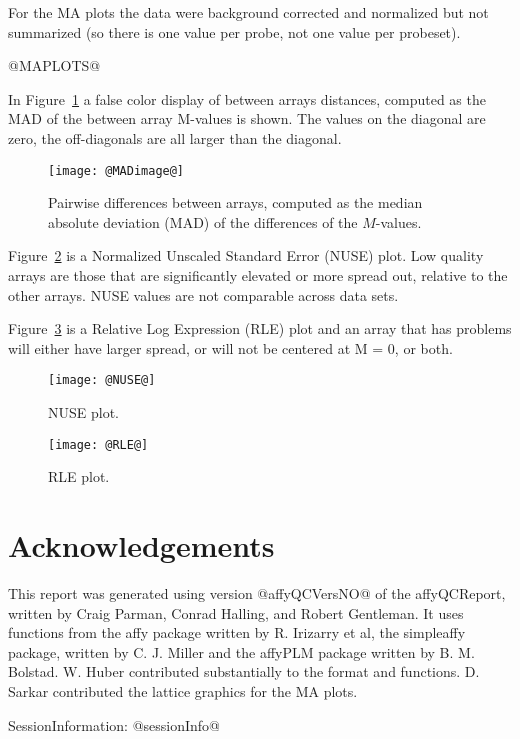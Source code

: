\documentclass[11pt]{article}
\newcommand{\Rpackage}[1]{{\textsf{#1}}}
\begin{document}
For the MA plots the data were background corrected and normalized 
but not summarized (so there is one value per probe, not one value
per probeset). 

@MAPLOTS@

In Figure~\ref{fig:MADimage} a false color display of between arrays
distances, computed as the MAD of the between array M-values is shown.
The values on the diagonal are zero, the off-diagonals are all larger
than the diagonal.

\begin{figure}[tp]
  \centering
\texttt{[image: @MADimage@]}
\caption{\label{fig:MADimage}%
Pairwise differences between arrays, computed as the median absolute 
deviation (MAD) of the differences of the $M$-values.}
\end{figure}

Figure~\ref{fig:NUSE} is a Normalized Unscaled Standard Error (NUSE) 
plot.  Low quality arrays are those that are significantly elevated or 
more spread out, relative to the other arrays.
NUSE values are not comparable across data sets.

Figure~\ref{fig:RLE} is a Relative Log Expression (RLE) plot
and an array that has problems will either have larger spread, or 
will not be centered at M = 0, or both.

\begin{figure}[tp]
  \centering
\texttt{[image: @NUSE@]}
\caption{\label{fig:NUSE}%
NUSE plot.}
\end{figure}

\begin{figure}[tp]
  \centering
\texttt{[image: @RLE@]}
\caption{\label{fig:RLE}%
RLE plot.}
\end{figure}

\section*{Acknowledgements}
\label{sec:ack}

This report was generated using version @affyQCVersNO@ of the 
\Rpackage{affyQCReport}, written by Craig Parman, Conrad Halling, and
Robert Gentleman. It uses functions from the \Rpackage{affy} package
written by R. Irizarry et al, the \Rpackage{simpleaffy} package, written
by C. J. Miller and the \Rpackage{affyPLM} package written by B. M. Bolstad.
W. Huber contributed substantially to the format and functions.
D. Sarkar contributed the lattice graphics for the MA plots.

SessionInformation: 
@sessionInfo@
\end{document}
